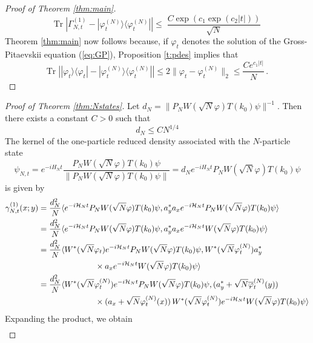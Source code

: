 \documentclass[11pt,a4paper,DIV11]{scrartcl}	%
\newcommand{\tr}{\mbox{Tr}}
\newcommand{\cH}{{\cal H}}
\begin{document}
\begin{proof}[Proof of Theorem \ref{thm:main}]
\[  \tr \; \left| \Gamma^{(1)}_{N,t} - |\varphi^{(N)}_t \rangle \langle \varphi_t^{(N)}| \right| \leq \; \frac{C\exp (c_1 \exp (c_2 |t|))}{\sqrt{N}} \]
Theorem \ref{thm:main} now follows because, if $\varphi_t$ denotes the solution of the Gross-Pitaevskii equation (\ref{eq:GP}), Proposition \ref{t:pdes} implies that
\[ \tr \; \left| |\varphi_t \rangle \langle \varphi_t| -  |\varphi^{(N)}_t \rangle \langle \varphi^{(N)}_t| \right| \leq 2 \| \varphi_t - \varphi_t^{(N)} \|_2 \leq \frac{C e^{c_1 |t|}}{N} \, . \]
\end{proof}

\begin{proof}[Proof of Theorem \ref{thm:Nstates}]
Let $d_N = \| P_N W(\sqrt{N} \varphi) T(k_0) \psi \|^{-1}$. Then there exists a constant $C >0$ such that
\[ d_N \leq C N^{1/4} \]
The kernel of the one-particle reduced density associated with the $N$-particle state 
\[ \psi_{N,t} = e^{-iH_N t} \frac{P_N W(\sqrt{N} \varphi) T(k_0) \psi}{\| P_N W(\sqrt{N} \varphi) T(k_0) \psi \|} = d_N e^{-i H_N t} P_N W(\sqrt{N} \varphi) T(k_0) \psi  \]
is given by
\[\begin{split}  \gamma^{(1)}_{N,t} (x;y) = \; & \frac{d_N^2}{N} \langle e^{-i \cH_N t} P_N W(\sqrt{N} \varphi) T(k_0) \psi , a_y^* a_x e^{-i \cH_N t} P_N W(\sqrt{N} \varphi) T(k_0) \psi \rangle \\ = \; & \frac{d_N^2}{N} \langle e^{-i \cH_N t} P_N W(\sqrt{N} \varphi) T(k_0) \psi , a_y^* a_x e^{-i \cH_N t} W(\sqrt{N} \varphi) T(k_0) \psi \rangle \\ =\; &\frac{d_N^2}{N} \langle W^* (\sqrt{N} \varphi_t) e^{-i \cH_N t} P_N W(\sqrt{N} \varphi) T(k_0) \psi , W^* (\sqrt{N} \varphi^{(N)}_t) a_y^* \\ &\hspace{2cm} \times  a_x e^{-i \cH_N t} W(\sqrt{N} \varphi) T(k_0) \psi \rangle \\
=\; &\frac{d_N^2}{N} \langle W^* (\sqrt{N} \varphi^{(N)}_t) e^{-i \cH_N t} P_N W(\sqrt{N} \varphi) T(k_0) \psi , (a_y^* + \sqrt{N} \overline{\varphi}_t^{(N)} (y)) \\ &\hspace{2cm} \times   (a_x + \sqrt{N} \varphi^{(N)}_t (x)) \, W^* (\sqrt{N} \varphi^{(N)}_t)  e^{-i \cH_N t} W(\sqrt{N} \varphi) T(k_0) \psi \rangle  
\end{split}\]
Expanding the product, we obtain
\[ \begin{split}

\end{split}\]
\end{proof}
\end{document}

